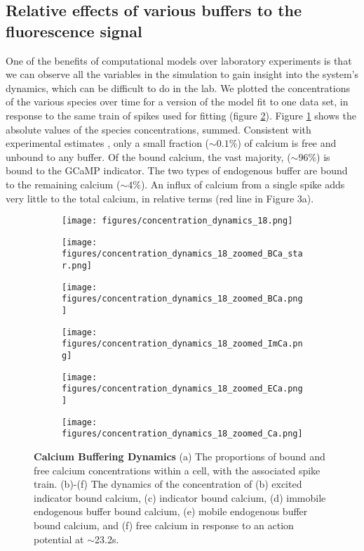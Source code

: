 \documentclass[a4paper,12pt]{article}
\theoremstyle{definition}
\begin{document}
\subsection{Relative effects of various buffers to the fluorescence signal}
One of the benefits of computational models over laboratory experiments is that we can observe all the variables in the simulation to gain insight into the system’s dynamics, which can be difficult to do in the lab. We plotted the concentrations of the various species over time for a version of the model fit to one data set, in response to the same train of spikes used for fitting (figure \ref{fig:concentrations}). Figure \ref{fig:concentration_dynamics_a} shows the absolute values of the species concentrations, summed. Consistent with experimental estimates \cite{maravall}, only a small fraction ($\sim 0.1\%$) of calcium is free and unbound to any buffer. Of the bound calcium, the vast majority, ($\sim 96\%$) is bound to the GCaMP indicator. The two types of endogenous buffer are bound to the remaining calcium ($\sim 4\%$). An influx of calcium from a single spike adds very little to the total calcium, in relative terms (red line in Figure 3a).
\begin{figure}[p]
  \begin{subfigure}{0.5\textwidth}
    \texttt{[image: figures/concentration\_dynamics\_18.png]}
    \caption{}
    \label{fig:concentration_dynamics_a}
  \end{subfigure}
  \begin{subfigure}{0.5\textwidth}
    \texttt{[image: figures/concentration\_dynamics\_18\_zoomed\_BCa\_star.png]}
    \caption{}
  \end{subfigure}
  \begin{subfigure}{0.5\textwidth}
    \texttt{[image: figures/concentration\_dynamics\_18\_zoomed\_BCa.png]}
    \caption{}
  \end{subfigure}
  \begin{subfigure}{0.5\textwidth}
    \texttt{[image: figures/concentration\_dynamics\_18\_zoomed\_ImCa.png]}
    \caption{}
  \end{subfigure}
  \begin{subfigure}{0.5\textwidth}
    \texttt{[image: figures/concentration\_dynamics\_18\_zoomed\_ECa.png]}
    \caption{}
  \end{subfigure}
  \begin{subfigure}{0.5\textwidth}
    \texttt{[image: figures/concentration\_dynamics\_18\_zoomed\_Ca.png]}
    \caption{}
  \end{subfigure}
  \caption{\textbf{Calcium Buffering Dynamics } (a) The proportions of bound and free calcium concentrations within a cell, with the associated spike train. (b)-(f) The dynamics of the concentration of (b) excited indicator bound calcium, (c) indicator bound calcium, (d) immobile endogenous buffer bound calcium, (e) mobile endogenous buffer bound calcium, and (f) free calcium in response to an action potential at $\sim$23.2s.}
  \label{fig:concentrations}
\end{figure}
\end{document}
